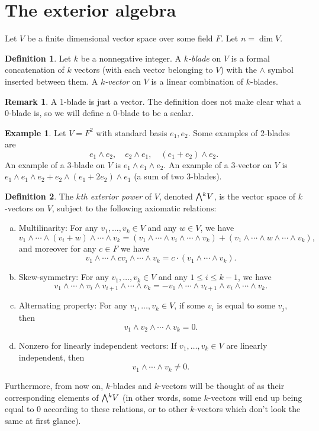 \documentclass[11pt,oneside]{amsart}
\theoremstyle{definition}
\newtheorem{definition}{Definition}
\newtheorem{remark}{Remark}
\newtheorem{example}{Example}
\theoremstyle{plain}
\newcommand{\extp}{\mathchoice{{\textstyle\bigwedge}}%
    {{\bigwedge}}%
    {{\textstyle\wedge}}%
    {{\scriptstyle\wedge}}}
\begin{document}
\section{The exterior algebra}
Let $V$ be a finite dimensional vector space over some field $F$. Let $n=\dim V$.
\begin{definition}
    Let $k$ be a nonnegative integer. A \emph{$k$-blade} on $V$ is a formal concatenation of $k$ vectors (with each vector belonging to $V$) with the $\wedge$ symbol inserted between them. A \emph{$k$-vector} on $V$ is a linear combination of $k$-blades.
\end{definition}
\begin{remark}
    A 1-blade is just a vector. The definition does not make clear what a 0-blade is, so we will define a 0-blade to be a scalar.
\end{remark}
\begin{example}
    Let $V=F^2$ with standard basis $e_1,e_2$. Some examples of 2-blades are
    \[e_1\wedge e_2,\quad e_2\wedge e_1,\quad (e_1+e_2)\wedge e_2.\]
    An example of a 3-blade on $V$ is $e_1\wedge e_1\wedge e_2$. An example of a 3-vector on $V$ is $e_1\wedge e_1\wedge e_2+e_2\wedge (e_1+2e_2)\wedge e_1$ (a sum of two 3-blades).
\end{example}
\begin{definition}
    The \emph{$k$th exterior power} of $V$, denoted $\extp^k V$, is the vector space of $k$-vectors on $V$, subject to the following axiomatic relations:
    \begin{enumerate}[(a)]
        \item Multilinarity: For any $v_1,\dots,v_k\in V$ and any $w\in V$, we have
        \[v_1\wedge \cdots\wedge (v_i+w)\wedge\cdots\wedge v_k=(v_1\wedge\cdots\wedge v_i\wedge\cdots\wedge v_k)+(v_1\wedge\cdots\wedge w\wedge\cdots\wedge v_k),\]
        and moreover for any $c\in F$ we have
        \[v_1\wedge\cdots\wedge cv_i\wedge\cdots\wedge v_k=c\cdot (v_1\wedge\cdots \wedge v_k).\]
        \item Skew-symmetry: For any $v_1,\dots,v_k\in V$ and any $1\leq i\leq k-1$, we have
        \[v_1\wedge\cdots\wedge v_i\wedge v_{i+1}\wedge\cdots\wedge v_k=-v_1\wedge\cdots\wedge v_{i+1}\wedge v_i\wedge\cdots\wedge v_k.\]
        \item Alternating property: For any $v_1,\dots,v_k\in V$, if some $v_i$ is equal to some $v_j$, then
        \[v_1\wedge v_2\wedge\cdots\wedge v_k=0.\]
        \item Nonzero for linearly independent vectors: If $v_1,\dots,v_k\in V$ are linearly independent, then
        \[v_1\wedge\cdots\wedge v_k\neq 0.\]
    \end{enumerate}
    Furthermore, from now on, $k$-blades and $k$-vectors will be thought of as their corresponding elements of $\extp^k V$ (in other words, some $k$-vectors will end up being equal to 0 according to these relations, or to other $k$-vectors which don't look the same at first glance).
\end{definition}
\end{document}

